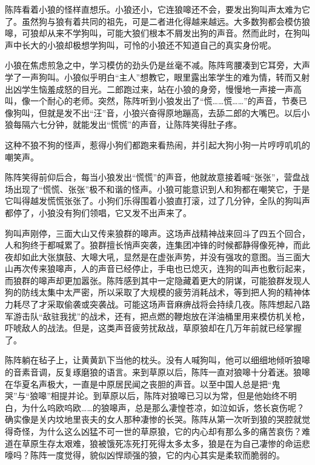 \par 陈阵看着小狼的怪样直想乐。小狼还小，它连狼嗥还不会，要发出狗叫声太难为它了。虽然狗与狼有着共同的祖先，可是二者进化得越来越远。大多数狗都会模仿狼嗥，可狼却从来不学狗叫，可能大狼们根本不屑发出狗的声音。然而此时，在狗叫声中长大的小狼却极想学狗叫，可怜的小狼还不知道自己的真实身份呢。
\par 小狼在焦虑煎急之中，学习模仿的劲头仍是丝毫不减。陈阵弯腰凑到它耳旁，大声学了一声狗叫。小狼似乎明白“主人”想教它，眼里露出笨学生的难为情，转而又射出凶学生恼羞成怒的目光。二郎跑过来，站在小狼的身旁，慢慢地一声接一声高叫，像一个耐心的老师。突然，陈阵听到小狼发出了“慌……慌……”的声音，节奏已像狗叫，但就是发不出“汪”音，小狼兴奋得原地蹦高，去舔二郎的大嘴巴。以后小狼每隔六七分钟，就能发出“慌慌”的声音，让陈阵笑得肚子疼。
\par 这种不狼不狗的怪声，惹得小狗们都跑来看热闹，并引起大狗小狗一片哼哼叽叽的嘲笑声。
\par 陈阵笑得前仰后合，每当小狼发出“慌慌”的声音，他就故意接着喊“张张”，营盘战场出现了“慌慌、张张”极不和谐的怪声。小狼可能意识到人和狗都在嘲笑它，于是它叫得越发慌慌张张了。小狗们乐得围着小狼直打滚，过了几分钟，全队的狗叫声都停了，小狼没有狗们领唱，它又发不出声来了。
\par 狗叫声刚停，三面大山又传来狼群的嗥声。这场声战精神战来回斗了四五个回合，人和狗终于都喊累了。狼群擅长悄声突袭，连集团冲锋的时候都静得像死神，而此夜却如此大张旗鼓、大嗥大吼，显然是在虚张声势，并没有强攻的意图。当三面大山再次传来狼嗥声，人的声音已经停止，手电也已熄灭，连狗的叫声也敷衍起来，而狼群的嗥声却更加嚣张。陈阵感到其中一定隐藏着更大的阴谋，可能狼群发现人狗的防线太集中太严密，所以采取了大规模的疲劳消耗战术，等到把人狗的精神体力耗尽了才采取偷袭或突袭战。可能这场声音麻痹战将会持续几夜。陈阵想起八路军游击队“敌驻我扰”的战术，还有，把点燃的鞭炮放在洋油桶里用来模仿机关枪，吓唬敌人的战法。但是，这类声音疲劳扰敌战，草原狼却在几万年前就已经掌握了。
\par 
\par 陈阵躺在毡子上，让黄黄趴下当他的枕头。没有人喊狗叫，他可以细细地倾听狼嗥的音素音调，反复琢磨狼的语言。来到草原以后，陈阵一直对狼嗥十分着迷。狼嗥在华夏名声极大，一直是中原居民闻之丧胆的声音。以至中国人总是把“鬼哭”与“狼嗥”相提并论。到草原以后，陈阵对狼嗥已习以为常，但是他始终不明白，为什么呜欧呜欧……的狼嗥声，总是那么凄惶苍凉，如泣如诉，悠长哀伤呢？确实像是关内坟地里丧夫的女人那种凄惨的长哭。陈阵从第一次听到狼的哭腔就觉得奇怪，为什么这么凶猛不可一世的草原狼，它的内心却有那么多的痛苦哀伤？难道在草原生存太艰难，狼被饿死冻死打死得太多太多，狼是在为自己凄惨的命运悲嚎吗？陈阵一度觉得，貌似凶悍顽强的狼，它的内心其实是柔软而脆弱的。
